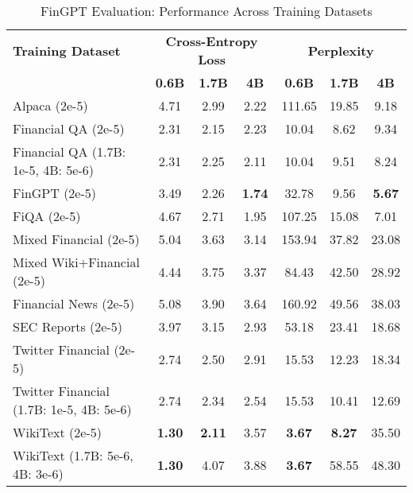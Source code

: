 
\begin{table}[h]
\centering
\caption[FinGPT Evaluation: Cross-Dataset Performance]{FinGPT Evaluation: Performance Across Training Datasets}
\label{tab:cross_fingpt}
\begin{tabular}{l|ccc|ccc}
\hline
\textbf{Training Dataset} & \multicolumn{3}{c|}{\textbf{Cross-Entropy Loss}} & \multicolumn{3}{c}{\textbf{Perplexity}} \\
\cline{2-4} \cline{5-7}
  & \textbf{0.6B} & \textbf{1.7B} & \textbf{4B} & \textbf{0.6B} & \textbf{1.7B} & \textbf{4B} \\
Alpaca (2e-5) & 4.71 & 2.99 & 2.22 & 111.65 & 19.85 & 9.18  \\
Financial QA (2e-5) & 2.31 & 2.15 & 2.23 & 10.04 & 8.62 & 9.34  \\
Financial QA (1.7B: 1e-5, 4B: 5e-6) & 2.31 & 2.25 & 2.11 & 10.04 & 9.51 & 8.24  \\
FinGPT (2e-5) & 3.49 & 2.26 & \textbf{1.74} & 32.78 & 9.56 & \textbf{5.67}  \\
FiQA (2e-5) & 4.67 & 2.71 & 1.95 & 107.25 & 15.08 & 7.01  \\
Mixed Financial (2e-5) & 5.04 & 3.63 & 3.14 & 153.94 & 37.82 & 23.08  \\
Mixed Wiki+Financial (2e-5) & 4.44 & 3.75 & 3.37 & 84.43 & 42.50 & 28.92  \\
Financial News (2e-5) & 5.08 & 3.90 & 3.64 & 160.92 & 49.56 & 38.03  \\
SEC Reports (2e-5) & 3.97 & 3.15 & 2.93 & 53.18 & 23.41 & 18.68  \\
Twitter Financial (2e-5) & 2.74 & 2.50 & 2.91 & 15.53 & 12.23 & 18.34  \\
Twitter Financial (1.7B: 1e-5, 4B: 5e-6) & 2.74 & 2.34 & 2.54 & 15.53 & 10.41 & 12.69  \\
WikiText (2e-5) & \textbf{1.30} & \textbf{2.11} & 3.57 & \textbf{3.67} & \textbf{8.27} & 35.50  \\
WikiText (1.7B: 5e-6, 4B: 3e-6) & \textbf{1.30} & 4.07 & 3.88 & \textbf{3.67} & 58.55 & 48.30  \\
\hline
\end{tabular}
\end{table}

